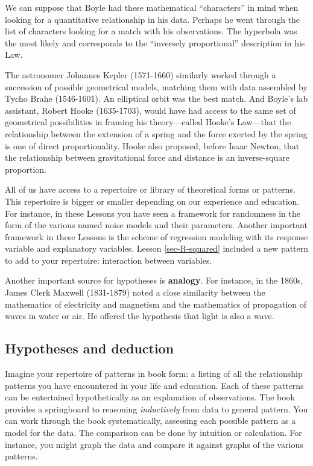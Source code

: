 \documentclass[
  letterpaper,
  DIV=11,
  numbers=noendperiod,
  oneside]{scrartcl}
\begin{document}
We can suppose that Boyle had these mathematical ``characters'' in mind
when looking for a quantitative relationship in his data. Perhaps he
went through the list of characters looking for a match with his
observations. The hyperbola was the most likely and corresponds to the
``inversely proportional'' description in his Law.

The astronomer Johannes Kepler (1571-1660) similarly worked through a
succession of possible geometrical models, matching them with data
assembled by Tycho Brahe (1546-1601). An elliptical orbit was the best
match. And Boyle's lab assistant, Robert Hooke (1635-1703), would have
had access to the same set of geometrical possibilities in framing his
theory---called Hooke's Law---that the relationship between the
extension of a spring and the force exerted by the spring is one of
direct proportionality. Hooke also proposed, before Isaac Newton, that
the relationship between gravitational force and distance is an
inverse-square proportion.

All of us have access to a repertoire or library of theoretical forms or
patterns. This repertoire is bigger or smaller depending on our
experience and education. For instance, in these Lessons you have seen a
framework for randomness in the form of the various named noise models
and their parameters. {} Another important framework in these
Lessons is the scheme of regression modeling with its response variable
and explanatory variables. Lesson \ref{sec-R-squared} included a new
pattern to add to your repertoire: interaction between variables.

Another important source for hypotheses is \textbf{analogy}. For
instance, in the 1860s, James Clerk Maxwell (1831-1879) noted a close
similarity between the mathematics of electricity and magnetism and the
mathematics of propagation of waves in water or air. He offered the
hypothesis that light is also a wave.

\subsection{Hypotheses and deduction}\label{hypotheses-and-deduction}

Imagine your repertoire of patterns in book form: a listing of all the
relationship patterns you have encountered in your life and education.
Each of these patterns can be entertained hypothetically as an
explanation of observations. The book provides a springboard to
reasoning \emph{inductively} from data to general pattern. You can work
through the book systematically, assessing each possible pattern as a
model for the data. The comparison can be done by intuition or
calculation. For instance, you might graph the data and compare it
against graphs of the various patterns.
\end{document}
